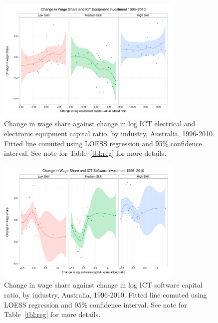 \begin{figure}
  \centering
\includegraphics[width=0.8\textwidth]{../figure/wage_share_equipment_skill.pdf}
  \caption{Change in wage share against change in log ICT electrical and electronic equipment capital ratio, by industry, Australia, 1996-2010.
    Fitted line comuted using LOESS regression and 95\% confidence interval. See note for Table~\ref{tbl:reg} for more details.
  }
  \label{fig:equip}
\end{figure}

\begin{figure}
  \centering
  \includegraphics[width=0.8\textwidth]{../figure/wage_share_software_skill.pdf}
  \caption{Change in wage share against change in log ICT software capital ratio, by industry, Australia, 1996-2010. Fitted line comuted using LOESS regression and 95\% confidence interval.
    See note for Table~\ref{tbl:reg} for more details.
  }
  \label{fig:soft}
\end{figure}


